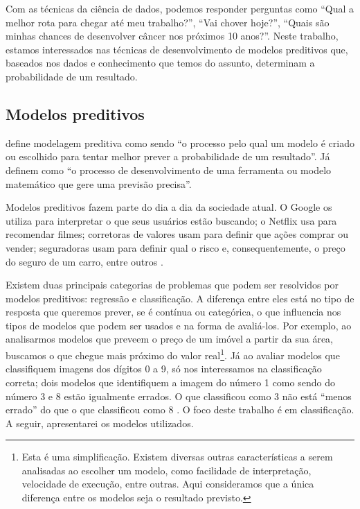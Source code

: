 \documentclass[a4paper,titlepage]{ppgi}\usepackage[]{graphicx}\usepackage[]{color}
\begin{document}
Com as técnicas da ciência de dados, podemos responder perguntas como ``Qual a
melhor rota para chegar até meu trabalho?'', ``Vai chover hoje?'', ``Quais são
minhas chances de desenvolver câncer nos próximos 10 anos?''. Neste trabalho,
estamos interessados nas técnicas de desenvolvimento de modelos preditivos que,
baseados nos dados e conhecimento que temos do assunto, determinam a
probabilidade de um resultado.

\subsection{Modelos preditivos}

 define modelagem preditiva como sendo ``o processo
pelo qual um modelo é criado ou escolhido para tentar melhor prever a
probabilidade de um resultado''. Já  definem como ``o
processo de desenvolvimento de uma ferramenta ou modelo matemático que gere uma
previsão precisa''.

Modelos preditivos fazem parte do dia a dia da sociedade atual. O Google os
utiliza para interpretar o que seus usuários estão buscando; o Netflix usa para
recomendar filmes; corretoras de valores usam para definir que ações comprar ou
vender; seguradoras usam para definir qual o risco e, consequentemente, o preço
do seguro de um carro, entre outros \cite{Levy2010}.

Existem duas principais categorias de problemas que podem ser resolvidos por
modelos preditivos: regressão e classificação. A diferença entre eles está no
tipo de resposta que queremos prever, se é contínua ou categórica, o que
influencia nos tipos de modelos que podem ser usados e na forma de avaliá-los.
Por exemplo, ao analisarmos modelos que preveem o preço de um imóvel a partir
da sua área, buscamos o que chegue mais próximo do valor real\footnote{Esta é
uma simplificação. Existem diversas outras características a serem analisadas
ao escolher um modelo, como facilidade de interpretação, velocidade de
execução, entre outras. Aqui consideramos que a única diferença entre os
modelos seja o resultado previsto.}. Já ao avaliar modelos que classifiquem
imagens dos dígitos 0 a 9, só nos interessamos na classificação correta; dois
modelos que identifiquem a imagem do número 1 como sendo do número 3 e 8 estão
igualmente errados. O que classificou como 3 não está ``menos errado'' do que o
que classificou como 8 \cite{Kuhn2013,Zumel2014}. O foco deste trabalho é em
classificação. A seguir, apresentarei os modelos utilizados.
\end{document}

